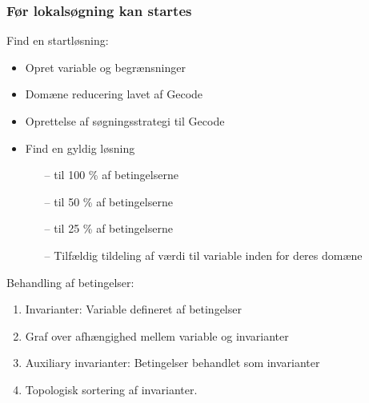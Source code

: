 \documentclass[smaller,handouts]{beamer}
\begin{document}



% 
\begin{frame}
 \frametitle{Før lokalsøgning kan startes}
Find en startløsning:
\begin{itemize}
\item Opret variable og begrænsninger \pause 
\item Domæne reducering lavet af Gecode \pause 
\item Oprettelse af søgningsstrategi til Gecode \pause 
\item Find en gyldig løsning \pause 
\begin{itemize}
 \item[--] til 100 \% af betingelserne
 \item[--] til 50 \% af betingelserne
 \item[--] til 25 \% af betingelserne
 \item[--] Tilfældig tildeling af værdi til variable inden for deres domæne
\end{itemize}
\end{itemize}
\end{frame}
\begin{frame}
Behandling af betingelser: \pause
 \begin{enumerate}[<+->]
\item Invarianter: Variable defineret af betingelser
\item Graf over afhængighed mellem variable og invarianter
\item Auxiliary invarianter: Betingelser behandlet som invarianter
\item Topologisk sortering af invarianter.
\end{enumerate}


\end{frame}
\end{document}
